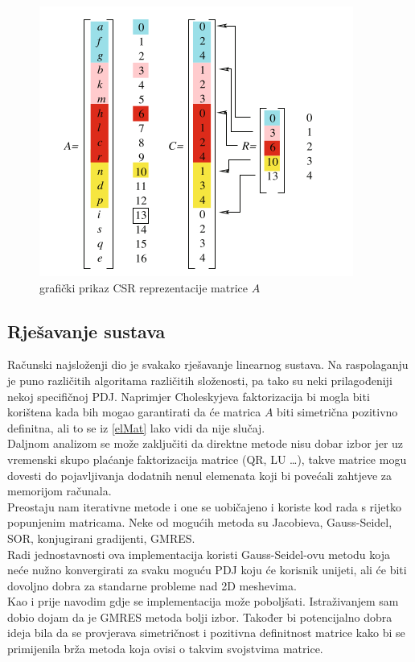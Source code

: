 \documentclass[zavrsnirad]{../fer}
\begin{document}
\begin{figure}[htb]
	\centering
	\includegraphics[width=0.7\linewidth]{Figures/CSR.png}
	\caption{grafički prikaz CSR reprezentacije matrice $A$}
	\label{CSR}
\end{figure}


\subsection{Rješavanje sustava}

Računski najsloženji dio je svakako rješavanje linearnog 
sustava. Na raspolaganju je puno različitih algoritama različitih 
složenosti, pa tako su neki prilagođeniji nekoj specifičnoj PDJ.
Naprimjer Choleskyjeva faktorizacija bi mogla biti korištena kada
bih mogao garantirati da će matrica $A$ biti simetrična pozitivno 
definitna, ali to se iz \ref{elMat} 
lako vidi da nije slučaj.
\bigskip
\\ 
Daljnom analizom se može zaključiti da direktne metode nisu dobar
izbor jer uz vremenski skupo plaćanje faktorizacija matrice (QR, LU \dots),
takve matrice mogu dovesti do pojavljivanja dodatnih nenul elemenata 
koji bi povećali zahtjeve za memorijom računala.
\bigskip
\\ 
Preostaju nam iterativne metode i one se uobičajeno i koriste kod 
rada s rijetko popunjenim matricama. Neke od mogućih metoda su 
Jacobieva, Gauss-Seidel, SOR, konjugirani gradijenti, GMRES.
\bigskip
\\
Radi jednostavnosti ova implementacija koristi Gauss-Seidel-ovu metodu 
koja neće nužno konvergirati za svaku moguću PDJ koju će korisnik unijeti,
ali će biti dovoljno dobra za standarne probleme nad 2D meshevima.
\bigskip
\\ 
Kao i prije navodim gdje se implementacija može poboljšati. Istraživanjem 
sam dobio dojam da je GMRES metoda bolji izbor. Također bi potencijalno dobra 
ideja bila da se provjerava simetričnost i pozitivna definitnost matrice 
kako bi se primijenila brža metoda koja ovisi o takvim svojstvima 
matrice.
\end{document}
